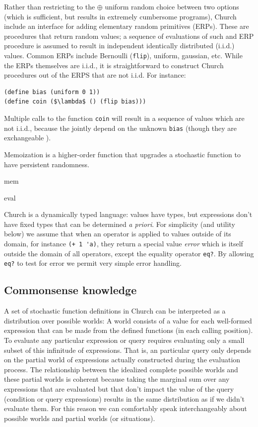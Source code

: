 \documentclass[12pt]{article}
\begin{document}
Rather than restricting to the $\oplus$ uniform random choice between two options (which is sufficient, but results in extremely cumbersome programs), Church include an interface for adding elementary random primitives (ERPs). These are procedures that return random values; a sequence of evaluations of such and ERP procedure is assumed to result in independent identically distributed (i.i.d.) values. Common ERPs include Bernoulli (\lstinline{flip}), uniform, gaussian, etc. While the ERPs themselves are i.i.d., it is straightforward to construct Church procedures out of the ERPS that are not i.i.d. For instance:
\begin{lstlisting}[mathescape]
(define bias (uniform 0 1))
(define coin ($\lambda$ () (flip bias)))
\end{lstlisting}
Multiple calls to the function \lstinline{coin} will result in a sequence of values which are not i.i.d., because the jointly depend on the unknown \lstinline{bias} (though they are exchangeable \cite{defintetti}).

Memoization is a higher-order function that upgrades a stochastic function to have persistent randomness. 

mem

eval






\label{bottom-val}
Church is a dynamically typed language: values have types, but expressions don't have fixed types that can be determined \emph{a priori}. For simplicity (and utility below) we assume that when an operator is applied to values outside of its domain, for instance \lstinline{(+ 1 'a)}, they return a special value \emph{error} which is itself outside the domain of all operators, except the equality operator \lstinline{eq?}. By allowing \lstinline{eq?} to test for error we permit very simple error handling.




\subsection{Commonsense knowledge}

A set of stochastic function definitions in Church can be interpreted as a distribution over possible worlds: A world consists of a value for each well-formed expression that can be made from the defined functions (in each calling position). 
To evaluate any particular expression or query requires evaluating only a small subset of this infinitude of expressions. 
That is, an particular query only depends on the partial world of expressions actually constructed during the evaluation process. 
The relationship between the idealized complete possible worlds and these partial worlds is coherent because taking the marginal sum over any expressions that are evaluated but that don't impact the value of the query (condition or query expressions) results in the same distribution as if we didn't evaluate them. 
For this reason we can comfortably speak interchangeably about possible worlds and partial worlds (or situations).
\end{document}
